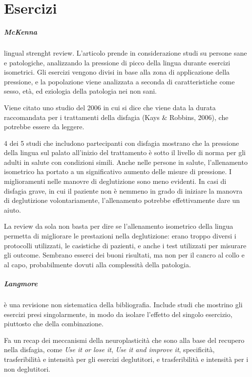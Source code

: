 \chapter{Esercizi}
\paragraph{McKenna} \label{par:mck} \cite{McKenna2017} lingual strenght review.
L’articolo prende in considerazione studi su persone sane e patologiche, 
analizzando la pressione di picco della lingua durante esercizi isometrici.
Gli esercizi vengono divisi in base alla zona di applicazione della pressione, 
e la popolazione viene analizzata a seconda di caratteristiche come sesso, età, 
ed eziologia della patologia nei non sani.

Viene citato uno studio del 2006 in cui si dice che viene data la durata 
raccomandata per i trattamenti della disfagia (Kays \& Robbins, 2006), che 
potrebbe essere da leggere.

4 dei 5 studi che includono partecipanti con disfagia mostrano che la pressione 
della lingua sul palato all’inizio del trattamento è sotto il livello di norma 
per gli adulti in salute con condizioni simili.
Anche nelle persone in salute, l’allenamento isometrico ha portato a un 
significativo aumento delle misure di pressione. I miglioramenti nelle manovre 
di deglutizione sono meno evidenti.
In casi di disfagia grave, in cui il paziente non è nemmeno in grado di 
iniziare la manovra di deglutizione volontariamente, l’allenamento potrebbe 
effettivamente dare un aiuto.

La review da sola non basta per dire se l’allenamento isometrico della lingua 
permetta di migliorare le prestazioni nella deglutizione: erano troppo diversi 
i protocolli utilizzati, le casistiche di pazienti, e anche i test utilizzati 
per misurare gli outcome.
Sembrano esserci dei buoni risultati, ma non per il cancro al collo e al capo, 
probabilmente dovuti alla complessità della patologia.

\paragraph{Langmore}\label{par:lan} \cite{Langmore2015} è una revisione non 
sistematica della 
bibliografia.
Include studi che mostrino gli esercizi presi singolarmente, in modo da isolare 
l'effetto del singolo esercizio, piuttosto che della combinazione.

Fa un recap dei meccanismi della neuroplasticità che sono alla base del 
recupero nella disfagia, come \textit{Use it or lose it}, \textit{Use it and 
improve it}, specificità, trasferibilità e intensità per gli esercizi 
deglutitori, e trasferibilità e intensità per i non deglutitori.

